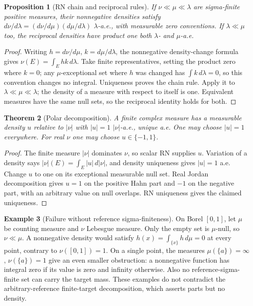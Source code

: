 \documentclass[11pt,oneside,openany]{book}
\newtheorem{theorem}{Theorem}[chapter]
\newtheorem{proposition}[theorem]{Proposition}
\theoremstyle{definition}
\newtheorem{example}[theorem]{Example}
\theoremstyle{remark}
\newcommand{\family}[1]{}
\begin{document}
\begin{proposition}[RN chain and reciprocal rules]\family{D11.15.rn_chain_rule}\label{d11:15:rn-chain-rule}
If $\nu\ll\mu\ll\lambda$ are sigma-finite positive measures, their
nonnegative densities satisfy
$d\nu/d\lambda=(d\nu/d\mu)(d\mu/d\lambda)$ $\lambda$-a.e., with
measurable zero conventions. If $\lambda\ll\mu$ too, the reciprocal
densities have product one both $\lambda$- and $\mu$-a.e.
\end{proposition}
\begin{proof}
Writing $h=d\nu/d\mu$, $k=d\mu/d\lambda$, the nonnegative
density-change formula gives $\nu(E)=\int_Ehk\,d\lambda$.
Take finite representatives, setting the product zero where $k=0$; any
$\mu$-exceptional set where $h$ was changed has $\int k\,d\lambda=0$,
so this convention changes no integral. Uniqueness proves the chain rule.
Apply it to $\lambda\ll\mu\ll\lambda$; the density of a measure with
respect to itself is one. Equivalent measures have the same null sets, so
the reciprocal identity holds for both.
\end{proof}

\begin{theorem}[Polar decomposition]\family{D11.15.polar_decomposition}\label{d11:15:polar-decomposition}
A finite complex measure has a measurable density $u$ relative to $|\nu|$
with $|u|=1$ $|\nu|$-a.e., unique a.e. One may choose $|u|=1$ everywhere.
For real $\nu$ one may choose $u\in\{-1,1\}$.
\end{theorem}
\begin{proof}
The finite measure $|\nu|$ dominates $\nu$, so scalar RN supplies $u$.
Variation of a density says $|\nu|(E)=\int_E|u|\,d|\nu|$, and density
uniqueness gives $|u|=1$ a.e. Change $u$ to one on its exceptional
measurable null set. Real Jordan decomposition gives $u=1$ on the positive
Hahn part and $-1$ on the negative part, with an arbitrary value on null
overlaps. RN uniqueness gives the claimed uniqueness.
\end{proof}

\begin{example}[Failure without reference sigma-finiteness]\family{D11.15.rn_non_sigmafinite_failure}\label{d11:15:rn-non-sigmafinite-failure}
On Borel $[0,1]$, let $\mu$ be counting measure and $\nu$ Lebesgue
measure. Only the empty set is $\mu$-null, so $\nu\ll\mu$.
A nonnegative density would satisfy $h(x)=\int_{\{x\}}h\,d\mu=0$ at
every point, contrary to $\nu([0,1])=1$. On a single point, the measures
$\mu(\{a\})=\infty$, $\nu(\{a\})=1$ give an even smaller obstruction:
a nonnegative function has integral zero if its value is zero and infinity
otherwise. Also no reference-sigma-finite set can carry the target mass.
These examples do not contradict the arbitrary-reference finite-target
decomposition, which asserts parts but no density.
\end{example}
\end{document}

